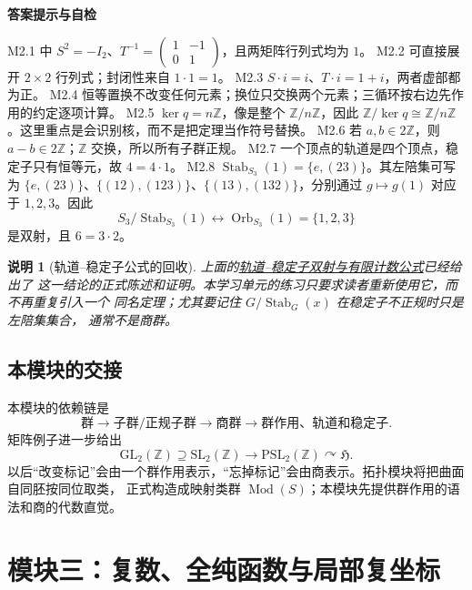 \documentclass[UTF8,fontset=none,a4paper,11pt]{ctexart}
\theoremstyle{foundation-definition}
\theoremstyle{foundation-theorem}
\theoremstyle{foundation-proposition}
\theoremstyle{foundation-example}
\theoremstyle{foundation-remark}
\newtheorem{remark}[definition]{说明}
\theoremstyle{foundation-theorem}
\newcommand{\Mod}{\operatorname{Mod}}
\newcommand{\term}[2]{\hyperref[#1]{#2}}
\newenvironment{answerkey}{%
\begin{mdframed}[backgroundcolor=examplebg,linecolor=examplepurple,linewidth=1.0pt,
  leftline=true,rightline=false,topline=false,bottomline=false,
  skipabove=7pt,skipbelow=8pt,innerleftmargin=10pt,innerrightmargin=8pt,
  innertopmargin=6pt,innerbottommargin=6pt]
{\sffamily\bfseries\color{examplepurple}答案提示与自检}\par\smallskip\small
}{\end{mdframed}}
\begin{document}
\begin{answerkey}
M2.1 中 \(S^2=-I_2\)、\(T^{-1}=\begin{pmatrix}1&-1\\0&1\end{pmatrix}\)，且两矩阵行列式均为 \(1\)。
M2.2 可直接展开 \(2\times2\) 行列式；封闭性来自 \(1\cdot1=1\)。
M2.3 \(S\cdot i=i\)、\(T\cdot i=1+i\)，两者虚部都为正。
M2.4 恒等置换不改变任何元素；换位只交换两个元素；三循环按右边先作用的约定逐项计算。
M2.5 \(\ker q=n\mathbb Z\)，像是整个 \(\mathbb Z/n\mathbb Z\)，因此
  \(\mathbb Z/\ker q\cong\mathbb Z/n\mathbb Z\)。这里重点是会识别核，而不是把定理当作符号替换。
M2.6 若 \(a,b\in2\mathbb Z\)，则 \(a-b\in2\mathbb Z\)；\(\mathbb Z\) 交换，所以所有子群正规。
M2.7 一个顶点的轨道是四个顶点，稳定子只有恒等元，故 \(4=4\cdot1\)。
M2.8 \(\operatorname{Stab}_{S_3}(1)=\{e,(23)\}\)。其左陪集可写为
\(\{e,(23)\}\)、\(\{(12),(123)\}\)、\(\{(13),(132)\}\)，分别通过
\(g\mapsto g(1)\) 对应于 \(1,2,3\)。因此
\[
S_3/\operatorname{Stab}_{S_3}(1)\longleftrightarrow
\operatorname{Orb}_{S_3}(1)=\{1,2,3\}
\]
是双射，且 \(6=3\cdot2\)。
\end{answerkey}

\begin{remark}[轨道--稳定子公式的回收]
上面的\term{prop:orbit-stabilizer-bijection}{轨道--稳定子双射与有限计数公式}已经给出了
这一结论的正式陈述和证明。本学习单元的练习只要求读者重新使用它，而不再重复引入一个
同名定理；尤其要记住 \(G/\operatorname{Stab}_G(x)\) 在稳定子不正规时只是左陪集集合，
通常不是商群。
\end{remark}

\subsection{本模块的交接}

本模块的依赖链是
\[
\text{群}
\longrightarrow
\text{子群/正规子群}
\longrightarrow
\text{商群}
\longrightarrow
\text{群作用、轨道和稳定子}.
\]
矩阵例子进一步给出
\[
\mathrm{GL}_2(\mathbb Z)
\supseteq\mathrm{SL}_2(\mathbb Z)
\longrightarrow
\mathrm{PSL}_2(\mathbb Z)
\curvearrowright\mathfrak H.
\]
以后“改变标记”会由一个群作用表示，“忘掉标记”会由商表示。拓扑模块将把曲面自同胚按同位取类，
正式构造成映射类群 \(\Mod(S)\)；本模块先提供群作用的语法和商的代数直觉。

\clearpage
\section{模块三：复数、全纯函数与局部复坐标}
\end{document}

